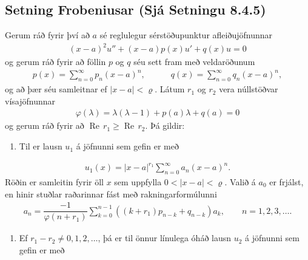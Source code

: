 \documentclass[a4paper,10pt,icelandic]{sphinxmanual}
\begin{document}
\subsection{Setning Frobeniusar (Sjá Setningu 8.4.5)}
\label{\detokenize{Kafli08:setning-frobeniusar-sja-setningu-8-4-5}}
Gerum ráð fyrir því að \(a\) sé reglulegur sérstöðupunktur afleiðujöfnunnar
\begin{equation*}
\begin{split}(x-a)^2u''+ (x-a)p(x)u'+q(x)u=0\end{split}
\end{equation*}
og gerum ráð fyrir að föllin \(p\) og \(q\) séu sett fram með veldaröðunum
\begin{equation*}
\begin{split}p(x)=\sum_{n=0}^\infty p_n(x-a)^n, \qquad\quad
q(x)=\sum_{n=0}^\infty q_n(x-a)^n,\end{split}
\end{equation*}
og að þær séu samleitnar ef \(|x-a|<\varrho\). Látum \(r_1\) og \(r_2\) vera núllstöðvar vísajöfnunnar
\begin{equation*}
\begin{split}\varphi(\lambda)=\lambda(\lambda-1)+p(a)\lambda+q(a)=0\end{split}
\end{equation*}
og gerum ráð fyrir að \(\operatorname{Re\, } r_1\geq \operatorname{Re\, } r_2\). Þá gildir:
\begin{enumerate}
%
\item {} 
Til er lausn \(u_1\) á jöfnunni sem gefin er með

\end{enumerate}
\begin{equation*}
\begin{split}u_1(x)=|x-a|^{r_1}\sum_{n=0}^\infty a_n(x-a)^n.\end{split}
\end{equation*}
Röðin er samleitin fyrir öll \(x\) sem uppfylla \(0<|x-a|<\varrho\). Valið á \(a_0\) er frjálst, en hinir stuðlar raðarinnar fást með rakningarformúlunni
\begin{equation*}
\begin{split}a_n=\dfrac{-1}{\varphi(n+r_1)}
\sum_{k=0}^{n-1}((k+r_1)p_{n-k}+q_{n-k})a_k, \qquad n=1,2,3,\dots.\end{split}
\end{equation*}\begin{enumerate}
%
\setcounter{enumi}{1}
\item {} 
Ef \(r_1-r_2\neq 0,1,2,\dots\), þá er til önnur línulega óháð lausn \(u_2\) á jöfnunni sem gefin er með

\end{enumerate}
\end{document}
